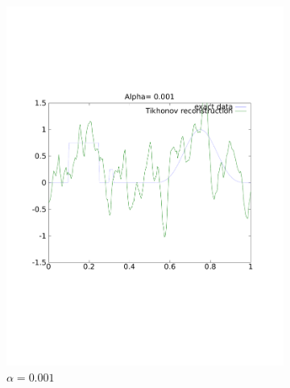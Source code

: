 \documentclass{article}
\begin{document}
\begin{figure}[!htb]
\begin{subfigure}[bh]{0.45\textwidth}
                \includegraphics[width=\textwidth]{plots/reconstruct001.pdf}
                \caption{$\alpha=0.001$}
        \end{subfigure}
        \centering
        \begin{subfigure}[bh]{0.45\textwidth}

\end{subfigure}
\end{figure}
\end{document}
